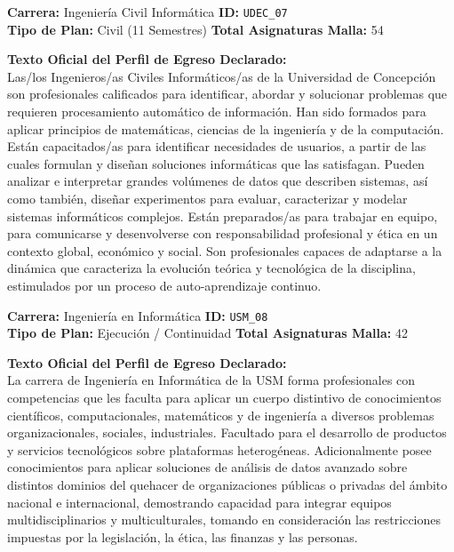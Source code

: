 \documentclass[11pt,a4paper]{article}
\begin{document}
\newpage

\begin{tcolorbox}[fichaStyle, title={UNIVERSIDAD 07: Universidad de Concepción (UDEC)}]
\small\sffamily
\textbf{Carrera:} Ingeniería Civil Informática \hfill \textbf{ID:} \texttt{UDEC\_07} \\
\textbf{Tipo de Plan:} Civil (11 Semestres) \hfill \textbf{Total Asignaturas Malla:} 54

\tcbline

\textbf{Texto Oficial del Perfil de Egreso Declarado:}\\[4pt]
{\small\rmfamily
Las/los Ingenieros/as Civiles Informáticos/as de la Universidad de Concepción son profesionales calificados para identificar, abordar y solucionar problemas que requieren procesamiento automático de información. Han sido formados para aplicar principios de matemáticas, ciencias de la ingeniería y de la computación. Están capacitados/as para identificar necesidades de usuarios, a partir de las cuales formulan y diseñan soluciones informáticas que las satisfagan. Pueden analizar e interpretar grandes volúmenes de datos que describen sistemas, así como también, diseñar experimentos para evaluar, caracterizar y modelar sistemas informáticos complejos. Están preparados/as para trabajar en equipo, para comunicarse y desenvolverse con responsabilidad profesional y ética en un contexto global, económico y social. Son profesionales capaces de adaptarse a la dinámica que caracteriza la evolución teórica y tecnológica de la disciplina, estimulados por un proceso de auto-aprendizaje continuo.
}
\end{tcolorbox}

\vspace{10pt}

\begin{tcolorbox}[fichaStyle, title={UNIVERSIDAD 08: Universidad Técnica Federico Santa María (USM)}]
\small\sffamily
\textbf{Carrera:} Ingeniería en Informática \hfill \textbf{ID:} \texttt{USM\_08} \\
\textbf{Tipo de Plan:} Ejecución / Continuidad \hfill \textbf{Total Asignaturas Malla:} 42

\tcbline

\textbf{Texto Oficial del Perfil de Egreso Declarado:}\\[4pt]
{\small\rmfamily
La carrera de Ingeniería en Informática de la USM forma profesionales con competencias que les faculta para aplicar un cuerpo distintivo de conocimientos científicos, computacionales, matemáticos y de ingeniería a diversos problemas organizacionales, sociales, industriales. Facultado para el desarrollo de productos y servicios tecnológicos sobre plataformas heterogéneas. Adicionalmente posee conocimientos para aplicar soluciones de análisis de datos avanzado sobre distintos dominios del quehacer de organizaciones públicas o privadas del ámbito nacional e internacional, demostrando capacidad para integrar equipos multidisciplinarios y multiculturales, tomando en consideración las restricciones impuestas por la legislación, la ética, las finanzas y las personas.
}
\end{tcolorbox}
\end{document}
